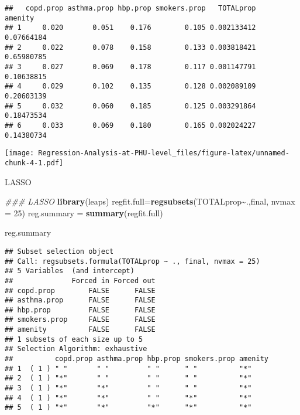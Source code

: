 \documentclass[]{article}
\newenvironment{Shaded}{\begin{snugshade}}{\end{snugshade}}
\newcommand{\CommentTok}[1]{\textcolor[rgb]{0.56,0.35,0.01}{\textit{#1}}}
\newcommand{\DataTypeTok}[1]{\textcolor[rgb]{0.13,0.29,0.53}{#1}}
\newcommand{\DecValTok}[1]{\textcolor[rgb]{0.00,0.00,0.81}{#1}}
\newcommand{\KeywordTok}[1]{\textcolor[rgb]{0.13,0.29,0.53}{\textbf{#1}}}
\newcommand{\NormalTok}[1]{#1}
\newcommand{\OperatorTok}[1]{\textcolor[rgb]{0.81,0.36,0.00}{\textbf{#1}}}
\newcommand{\StringTok}[1]{\textcolor[rgb]{0.31,0.60,0.02}{#1}}
\begin{document}
\begin{verbatim}
##   copd.prop asthma.prop hbp.prop smokers.prop   TOTALprop    amenity
## 1     0.020       0.051    0.176        0.105 0.002133412 0.07664184
## 2     0.022       0.078    0.158        0.133 0.003818421 0.65980785
## 3     0.027       0.069    0.178        0.117 0.001147791 0.10638815
## 4     0.029       0.102    0.135        0.128 0.002089109 0.20603139
## 5     0.032       0.060    0.185        0.125 0.003291864 0.18473534
## 6     0.033       0.069    0.180        0.165 0.002024227 0.14380734
\end{verbatim}

\begin{Shaded}
\end{Shaded}

\texttt{[image: Regression-Analysis-at-PHU-level\_files/figure-latex/unnamed-chunk-4-1.pdf]}

LASSO

\begin{Shaded}
\begin{Highlighting}[]
\CommentTok{\#\#\# LASSO}
\KeywordTok{library}\NormalTok{(leaps)}
\NormalTok{regfit.full=}\KeywordTok{regsubsets}\NormalTok{(TOTALprop}\OperatorTok{\textasciitilde{}}\NormalTok{.,final, }\DataTypeTok{nvmax =} \DecValTok{25}\NormalTok{)}
\NormalTok{reg.summary =}\StringTok{ }\KeywordTok{summary}\NormalTok{(regfit.full)}

\NormalTok{reg.summary}
\end{Highlighting}
\end{Shaded}

\begin{verbatim}
## Subset selection object
## Call: regsubsets.formula(TOTALprop ~ ., final, nvmax = 25)
## 5 Variables  (and intercept)
##              Forced in Forced out
## copd.prop        FALSE      FALSE
## asthma.prop      FALSE      FALSE
## hbp.prop         FALSE      FALSE
## smokers.prop     FALSE      FALSE
## amenity          FALSE      FALSE
## 1 subsets of each size up to 5
## Selection Algorithm: exhaustive
##          copd.prop asthma.prop hbp.prop smokers.prop amenity
## 1  ( 1 ) " "       " "         " "      " "          "*"    
## 2  ( 1 ) "*"       " "         " "      " "          "*"    
## 3  ( 1 ) "*"       "*"         " "      " "          "*"    
## 4  ( 1 ) "*"       "*"         " "      "*"          "*"    
## 5  ( 1 ) "*"       "*"         "*"      "*"          "*"
\end{verbatim}
\end{document}
